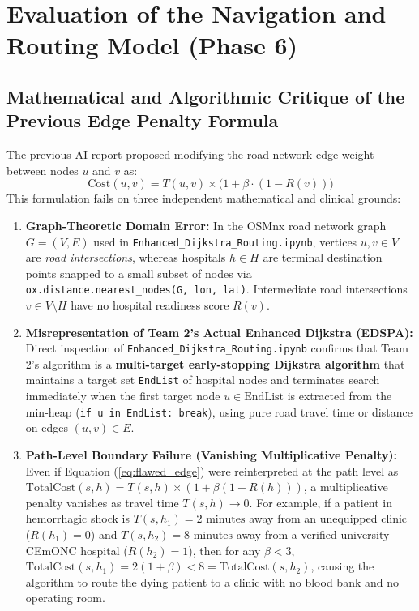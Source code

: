 \documentclass[10pt,a4paper]{article}
\begin{document}
\section{Evaluation of the Navigation and Routing Model (Phase 6)}

\subsection{Mathematical and Algorithmic Critique of the Previous Edge Penalty Formula}
The previous AI report proposed modifying the road-network edge weight between nodes $u$ and $v$ as:
\begin{equation}
    \text{Cost}(u, v) = T(u, v) \times \bigl(1 + \beta \cdot (1 - R(v))\bigr)
    \label{eq:flawed_edge}
\end{equation}
This formulation fails on three independent mathematical and clinical grounds:
\begin{enumerate}
    \item \textbf{Graph-Theoretic Domain Error:} In the OSMnx road network graph $G = (V, E)$ used in \texttt{Enhanced\_Dijkstra\_Routing.ipynb}, vertices $u, v \in V$ are \textit{road intersections}, whereas hospitals $h \in H$ are terminal destination points snapped to a small subset of nodes via \texttt{ox.distance.nearest\_nodes(G, lon, lat)}. Intermediate road intersections $v \in V \setminus H$ have no hospital readiness score $R(v)$.
    \item \textbf{Misrepresentation of Team 2's Actual Enhanced Dijkstra (EDSPA):} Direct inspection of \texttt{Enhanced\_Dijkstra\_Routing.ipynb} confirms that Team 2's algorithm is a \textbf{multi-target early-stopping Dijkstra algorithm} that maintains a target set \texttt{EndList} of hospital nodes and terminates search immediately when the first target node $u \in \text{EndList}$ is extracted from the min-heap (\texttt{if u in EndList: break}), using pure road travel time or distance on edges $(u, v) \in E$.
    \item \textbf{Path-Level Boundary Failure (Vanishing Multiplicative Penalty):} Even if Equation (\ref{eq:flawed_edge}) were reinterpreted at the path level as $\text{TotalCost}(s, h) = T(s, h) \times (1 + \beta(1 - R(h)))$, a multiplicative penalty vanishes as travel time $T(s, h) \to 0$. For example, if a patient in hemorrhagic shock is $T(s, h_1) = 2\text{ minutes}$ away from an unequipped clinic ($R(h_1) = 0$) and $T(s, h_2) = 8\text{ minutes}$ away from a verified university CEmONC hospital ($R(h_2) = 1$), then for any $\beta < 3$, $\text{TotalCost}(s, h_1) = 2(1+\beta) < 8 = \text{TotalCost}(s, h_2)$, causing the algorithm to route the dying patient to a clinic with no blood bank and no operating room.
\end{enumerate}
\end{document}
